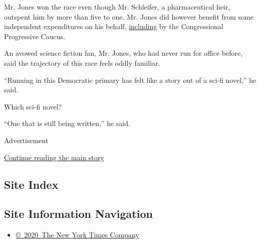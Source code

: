 Mr. Jones won the race even though Mr. Schleifer, a pharmaceutical heir,
outspent him by more than five to one. Mr. Jones did however benefit
from some independent expenditures on his behalf,
\href{https://www.politico.com/states/new-york/albany/story/2020/06/07/house-progressives-wade-into-new-york-primary-1291755}{including}
by the Congressional Progressive Caucus.

An avowed science fiction fan, Mr. Jones, who had never run for office
before, said the trajectory of this race feels oddly familiar.

``Running in this Democratic primary has felt like a story out of a
sci-fi novel,'' he said.

Which sci-fi novel?

``One that is still being written,'' he said.

Advertisement

\protect\hyperlink{after-bottom}{Continue reading the main story}

\hypertarget{site-index}{%
\subsection{Site Index}\label{site-index}}

\hypertarget{site-information-navigation}{%
\subsection{Site Information
Navigation}\label{site-information-navigation}}

\begin{itemize}
\tightlist
\item
  \href{https://help.nytimes3xbfgragh.onion/hc/en-us/articles/115014792127-Copyright-notice}{©~2020~The
  New York Times Company}
\end{itemize}

